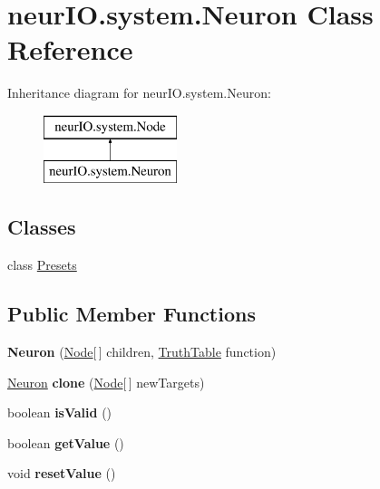 \hypertarget{classneur_i_o_1_1system_1_1_neuron}{}\section{neur\+I\+O.\+system.\+Neuron Class Reference}
\label{classneur_i_o_1_1system_1_1_neuron}
Inheritance diagram for neur\+I\+O.\+system.\+Neuron\+:\begin{figure}[H]
\begin{center}
\leavevmode
\includegraphics[height=2.000000cm]{classneur_i_o_1_1system_1_1_neuron}
\end{center}
\end{figure}
\subsection*{Classes}
\begin{DoxyCompactItemize}
\item 
class \hyperlink{classneur_i_o_1_1system_1_1_neuron_1_1_presets}{Presets}
\end{DoxyCompactItemize}
\subsection*{Public Member Functions}
\begin{DoxyCompactItemize}
\item 
\mbox{\label{classneur_i_o_1_1system_1_1_neuron_af05fb9eac54b8f73ed831b3f1fd1f665}} 
{\bfseries Neuron} (\hyperlink{classneur_i_o_1_1system_1_1_node}{Node}\mbox{[}$\,$\mbox{]} children, \hyperlink{classneur_i_o_1_1system_1_1_truth_table}{Truth\+Table} function)
\item 
\mbox{\label{classneur_i_o_1_1system_1_1_neuron_afdfb793400c4507d3d94d07595e5f3f6}} 
\hyperlink{classneur_i_o_1_1system_1_1_neuron}{Neuron} {\bfseries clone} (\hyperlink{classneur_i_o_1_1system_1_1_node}{Node}\mbox{[}$\,$\mbox{]} new\+Targets)
\item 
\mbox{\label{classneur_i_o_1_1system_1_1_neuron_aa1ff6529c3a04fc5ecdaf41dd8a143cb}} 
boolean {\bfseries is\+Valid} ()
\item 
\mbox{\label{classneur_i_o_1_1system_1_1_neuron_a7e2bfa3a562b6a26e3844d3285cbb669}} 
boolean {\bfseries get\+Value} ()
\item 
\mbox{\label{classneur_i_o_1_1system_1_1_neuron_a0adab143f0cbca556908f06d28cde838}} 
void {\bfseries reset\+Value} ()
\end{DoxyCompactItemize}
